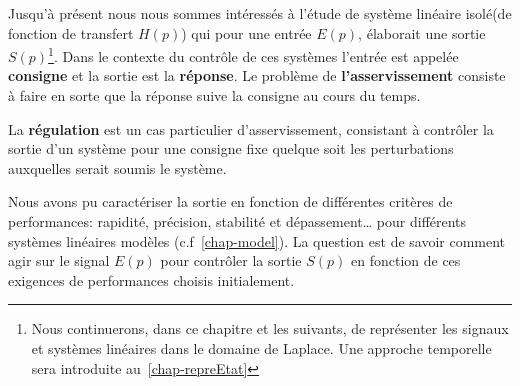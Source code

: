 \clearpage
Jusqu'à présent nous nous sommes intéressés à l'étude de système 
linéaire \og isolé\fg (de fonction de transfert $H(p)$) 
qui pour une entrée $E(p)$, élaborait une sortie $S(p)$\footnote{Nous
continuerons, dans ce chapitre et les suivants, de représenter 
les signaux et systèmes linéaires dans le domaine de Laplace. Une approche 
temporelle sera introduite au~\cref{chap-repreEtat}}. Dans le contexte du 
contrôle de ces systèmes l'entrée est appelée \textbf{consigne} et la sortie
est la \textbf{réponse}. Le problème de \textbf{l'asservissement} consiste 
à faire en sorte que la réponse suive la consigne au cours du temps.

La \textbf{régulation} est un cas particulier d'asservissement, consistant
à contrôler la sortie d'un système pour une consigne fixe quelque soit 
les perturbations auxquelles serait soumis le système.
\begin{center}
    
\end{center}
Nous avons pu caractériser la sortie en fonction de différentes 
critères de performances: rapidité, précision, stabilité et dépassement\ldots
pour différents systèmes linéaires modèles (c.f~\cref{chap-model}). 
La question est de savoir comment agir sur le 
signal $E(p)$ pour contrôler la sortie $S(p)$ en fonction de 
ces exigences de performances choisis initialement.

